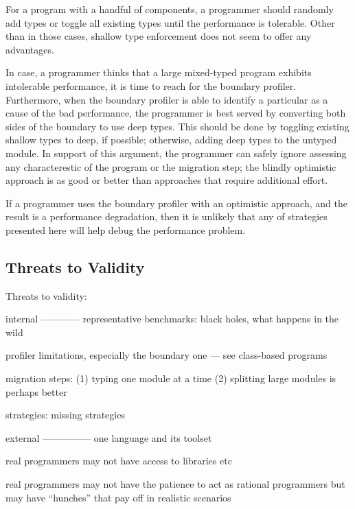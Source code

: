 For a program with a handful of components, a programmer should randomly
add types or toggle all existing types until the performance is tolerable.
Other than in those cases, shallow type enforcement does not seem to
offer any advantages. 

In case, a programmer thinks that a large mixed-typed program exhibits
intolerable performance, it is time to reach for the boundary profiler.
Furthermore, when the boundary profiler is able to identify a particular
as a cause of the bad performance, the programmer is best served by
converting both sides of the boundary to use deep types.  This should be
done by toggling existing shallow types to deep, if possible; otherwise,
adding deep types to the untyped module.  In support of this argument, the
programmer can safely ignore assessing any characterestic of the program
or the migration step; the blindly optimistic approach is as good or
better than approaches that require additional effort. 

If a programmer uses the boundary profiler with an optimistic approach,
and the result is a performance degradation, then it is unlikely that any
of strategies presented here will help debug the performance problem. 


\subsection{Threats to Validity}


Threats to validity:

internal
————
representative benchmarks: black holes, what happens in the wild 


profiler limitations, especially the boundary one — see class-based
programs

migration steps: (1) typing one module at a time 
                 (2) splitting large modules is perhaps better

strategies: missing strategies


external
—————
one language and its toolset 

real programmers may not have access to libraries etc

real programmers may not have the patience to act as rational programmers
but may have ``hunches'' that pay off in realistic scenarios 


